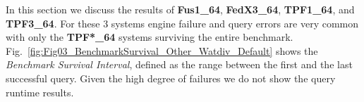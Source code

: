 %
%
%
%

In this section we discuss the results of \textbf{Fus1\_64}, \textbf{FedX3\_64}, \textbf{TPF1\_64}, and \textbf{TPF3\_64}. 
For these 3 systems engine failure and query errors are very common with only the \textbf{TPF*\_64} systems surviving the entire benchmark.
Fig.~\ref{fig:Fig03_BenchmarkSurvival_Other_Watdiv_Default} shows the \emph{Benchmark Survival Interval}, defined as the range between the first and the last successful query. 
Given the high degree of failures we do not show the query runtime results.


